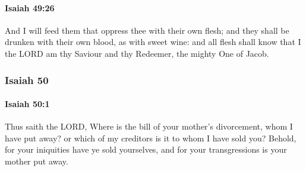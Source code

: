 		\paragraph{Isaiah 49:26} %
			\label{ISAIAH-49-26}

			And I will feed them that oppress thee with their own flesh; and they shall be drunken with their own blood, as with sweet wine: and all flesh shall know that I the LORD am thy Saviour and thy Redeemer, the mighty One of Jacob.

	\subsubsection{Isaiah 50} %
		\label{ISAIAH-50}

		\paragraph{Isaiah 50:1} %
			\label{ISAIAH-50-1}

			Thus saith the LORD, Where is the bill of your mother's divorcement, whom I have put away? or which of my creditors is it to whom I have sold you? Behold, for your iniquities have ye sold yourselves, and for your transgressions is your mother put away.

